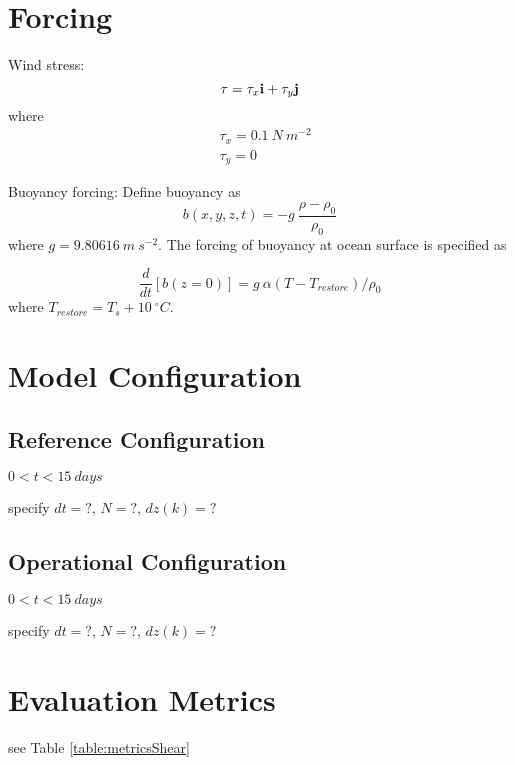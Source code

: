 \documentclass[fleqn, 12pt]{report}
\begin{document}
\section{Forcing}

Wind stress:
\begin{equation*}
{\bf \tau} = \tau_x {\bf i} + \tau_y {\bf j} \\
\end{equation*}
where
\begin{align*}
&\tau_x= 0.1 \ N \ m^{-2} \\
&\tau_y=0
\end{align*}

Buoyancy forcing:
Define buoyancy as
\begin{equation}
b(x,y,z,t) = -g \ \frac{\rho-\rho_0}{\rho_0}
\end{equation}
where $g=9.80616 \ m \ s^{-2}$. The forcing of buoyancy at ocean surface is specified as

\begin{equation}
\frac{d}{dt} \left[ b(z=0) \right] = g \ \alpha \left(T - T_{restore} \right) / \rho_0
\end{equation}
where $T_{restore}=T_s+10\ ^{\circ}C$.

\section{Model Configuration}
\subsection{Reference Configuration}
 $0<t<15 \ days$
 
 specify $dt=?$, $N=?$, $dz(k)=?$

\subsection{Operational Configuration}
 $0<t<15 \ days$
 
 specify $dt=?$, $N=?$, $dz(k)=?$

\section{Evaluation Metrics}
see Table \ref{table:metricsShear}
\end{document}
